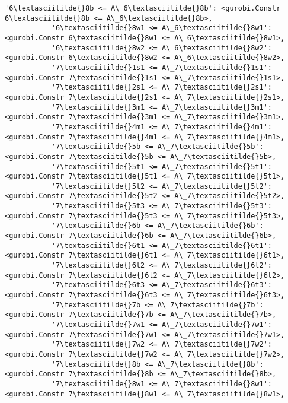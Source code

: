 \documentclass[11pt]{article}
\begin{document}
\begin{Verbatim}[commandchars=\\\{\}]
           '6\textasciitilde{}8b <= A\_6\textasciitilde{}8b': <gurobi.Constr 6\textasciitilde{}8b <= A\_6\textasciitilde{}8b>,
           '6\textasciitilde{}8w1 <= A\_6\textasciitilde{}8w1': <gurobi.Constr 6\textasciitilde{}8w1 <= A\_6\textasciitilde{}8w1>,
           '6\textasciitilde{}8w2 <= A\_6\textasciitilde{}8w2': <gurobi.Constr 6\textasciitilde{}8w2 <= A\_6\textasciitilde{}8w2>,
           '7\textasciitilde{}1s1 <= A\_7\textasciitilde{}1s1': <gurobi.Constr 7\textasciitilde{}1s1 <= A\_7\textasciitilde{}1s1>,
           '7\textasciitilde{}2s1 <= A\_7\textasciitilde{}2s1': <gurobi.Constr 7\textasciitilde{}2s1 <= A\_7\textasciitilde{}2s1>,
           '7\textasciitilde{}3m1 <= A\_7\textasciitilde{}3m1': <gurobi.Constr 7\textasciitilde{}3m1 <= A\_7\textasciitilde{}3m1>,
           '7\textasciitilde{}4m1 <= A\_7\textasciitilde{}4m1': <gurobi.Constr 7\textasciitilde{}4m1 <= A\_7\textasciitilde{}4m1>,
           '7\textasciitilde{}5b <= A\_7\textasciitilde{}5b': <gurobi.Constr 7\textasciitilde{}5b <= A\_7\textasciitilde{}5b>,
           '7\textasciitilde{}5t1 <= A\_7\textasciitilde{}5t1': <gurobi.Constr 7\textasciitilde{}5t1 <= A\_7\textasciitilde{}5t1>,
           '7\textasciitilde{}5t2 <= A\_7\textasciitilde{}5t2': <gurobi.Constr 7\textasciitilde{}5t2 <= A\_7\textasciitilde{}5t2>,
           '7\textasciitilde{}5t3 <= A\_7\textasciitilde{}5t3': <gurobi.Constr 7\textasciitilde{}5t3 <= A\_7\textasciitilde{}5t3>,
           '7\textasciitilde{}6b <= A\_7\textasciitilde{}6b': <gurobi.Constr 7\textasciitilde{}6b <= A\_7\textasciitilde{}6b>,
           '7\textasciitilde{}6t1 <= A\_7\textasciitilde{}6t1': <gurobi.Constr 7\textasciitilde{}6t1 <= A\_7\textasciitilde{}6t1>,
           '7\textasciitilde{}6t2 <= A\_7\textasciitilde{}6t2': <gurobi.Constr 7\textasciitilde{}6t2 <= A\_7\textasciitilde{}6t2>,
           '7\textasciitilde{}6t3 <= A\_7\textasciitilde{}6t3': <gurobi.Constr 7\textasciitilde{}6t3 <= A\_7\textasciitilde{}6t3>,
           '7\textasciitilde{}7b <= A\_7\textasciitilde{}7b': <gurobi.Constr 7\textasciitilde{}7b <= A\_7\textasciitilde{}7b>,
           '7\textasciitilde{}7w1 <= A\_7\textasciitilde{}7w1': <gurobi.Constr 7\textasciitilde{}7w1 <= A\_7\textasciitilde{}7w1>,
           '7\textasciitilde{}7w2 <= A\_7\textasciitilde{}7w2': <gurobi.Constr 7\textasciitilde{}7w2 <= A\_7\textasciitilde{}7w2>,
           '7\textasciitilde{}8b <= A\_7\textasciitilde{}8b': <gurobi.Constr 7\textasciitilde{}8b <= A\_7\textasciitilde{}8b>,
           '7\textasciitilde{}8w1 <= A\_7\textasciitilde{}8w1': <gurobi.Constr 7\textasciitilde{}8w1 <= A\_7\textasciitilde{}8w1>,

\end{Verbatim}
\end{document}
